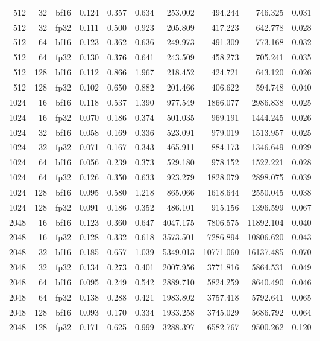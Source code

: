 \begin{table}[H]
{\begin{tabular}{@{}rrlrrrrrrr@{}}
512 & 32 & bf16 & 0.124 & 0.357 & 0.634 & 253.002 & 494.244 & 746.325 & 0.031 \\
512 & 32 & fp32 & 0.111 & 0.500 & 0.923 & 205.809 & 417.223 & 642.778 & 0.028 \\
512 & 64 & bf16 & 0.123 & 0.362 & 0.636 & 249.973 & 491.309 & 773.168 & 0.032 \\
512 & 64 & fp32 & 0.130 & 0.376 & 0.641 & 243.509 & 458.273 & 705.241 & 0.035 \\
512 & 128 & bf16 & 0.112 & 0.866 & 1.967 & 218.452 & 424.721 & 643.120 & 0.026 \\
512 & 128 & fp32 & 0.102 & 0.650 & 0.882 & 201.466 & 406.622 & 594.748 & 0.040 \\
1024 & 16 & bf16 & 0.118 & 0.537 & 1.390 & 977.549 & 1866.077 & 2986.838 & 0.025 \\
1024 & 16 & fp32 & 0.070 & 0.186 & 0.374 & 501.035 & 969.191 & 1444.245 & 0.026 \\
1024 & 32 & bf16 & 0.058 & 0.169 & 0.336 & 523.091 & 979.019 & 1513.957 & 0.025 \\
1024 & 32 & fp32 & 0.071 & 0.167 & 0.343 & 465.911 & 884.173 & 1346.649 & 0.029 \\
1024 & 64 & bf16 & 0.056 & 0.239 & 0.373 & 529.180 & 978.152 & 1522.221 & 0.028 \\
1024 & 64 & fp32 & 0.126 & 0.350 & 0.633 & 923.279 & 1828.079 & 2898.075 & 0.039 \\
1024 & 128 & bf16 & 0.095 & 0.580 & 1.218 & 865.066 & 1618.644 & 2550.045 & 0.038 \\
1024 & 128 & fp32 & 0.091 & 0.186 & 0.352 & 486.101 & 915.156 & 1396.599 & 0.067 \\
2048 & 16 & bf16 & 0.123 & 0.360 & 0.647 & 4047.175 & 7806.575 & 11892.104 & 0.040 \\
2048 & 16 & fp32 & 0.128 & 0.332 & 0.618 & 3573.501 & 7286.894 & 10806.620 & 0.043 \\
2048 & 32 & bf16 & 0.185 & 0.657 & 1.039 & 5349.013 & 10771.060 & 16137.485 & 0.070 \\
2048 & 32 & fp32 & 0.134 & 0.273 & 0.401 & 2007.956 & 3771.816 & 5864.531 & 0.049 \\
2048 & 64 & bf16 & 0.095 & 0.249 & 0.542 & 2889.710 & 5824.259 & 8640.490 & 0.046 \\
2048 & 64 & fp32 & 0.138 & 0.288 & 0.421 & 1983.802 & 3757.418 & 5792.641 & 0.065 \\
2048 & 128 & bf16 & 0.093 & 0.170 & 0.334 & 1933.258 & 3745.029 & 5686.792 & 0.064 \\
2048 & 128 & fp32 & 0.171 & 0.625 & 0.999 & 3288.397 & 6582.767 & 9500.262 & 0.120 \\
\bottomrule
\end{tabular}
}
\end{table}

